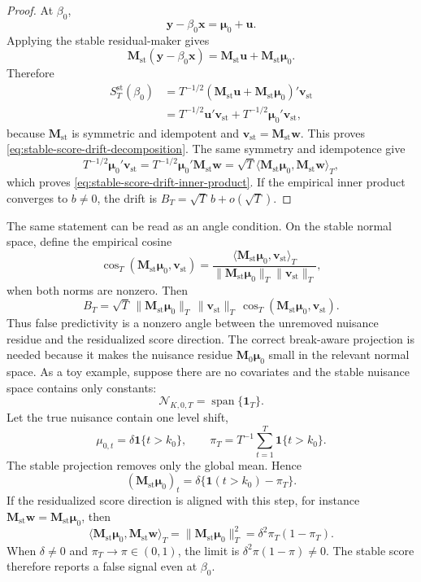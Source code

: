 \documentclass[12pt]{article}
\numberwithin{equation}{section}
\theoremstyle{definition}
\newcommand{\ind}{\mathbf 1}
\newcommand{\N}{\mathcal N}
\newcommand{\innerT}[2]{\langle #1,#2\rangle_T}
\begin{document}
\begin{proof}
At \(\beta_0\),
\[
    \bm y-\beta_0\bm x=\bm\mu_0+\bm u.
\]
Applying the stable residual-maker gives
\[
    \bm M_{\mathrm{st}}(\bm y-\beta_0\bm x)
    =
    \bm M_{\mathrm{st}}\bm u
    +
    \bm M_{\mathrm{st}}\bm\mu_0.
\]
Therefore
\[
\begin{aligned}
    S_T^{\mathrm{st}}(\beta_0)
    &=
    T^{-1/2}
    (\bm M_{\mathrm{st}}\bm u+\bm M_{\mathrm{st}}\bm\mu_0)'
    \bm v_{\mathrm{st}}  \\
    &=
    T^{-1/2}\bm u'\bm v_{\mathrm{st}}
    +
    T^{-1/2}\bm\mu_0'\bm v_{\mathrm{st}},
\end{aligned}
\]
because \(\bm M_{\mathrm{st}}\) is symmetric and idempotent and
\(\bm v_{\mathrm{st}}=\bm M_{\mathrm{st}}\bm w\). This proves
\eqref{eq:stable-score-drift-decomposition}. The same symmetry and idempotence
give
\[
    T^{-1/2}\bm\mu_0'\bm v_{\mathrm{st}}
    =
    T^{-1/2}\bm\mu_0'\bm M_{\mathrm{st}}\bm w
    =
    \sqrt T
    \innerT{\bm M_{\mathrm{st}}\bm\mu_0}
           {\bm M_{\mathrm{st}}\bm w},
\]
which proves \eqref{eq:stable-score-drift-inner-product}. If the empirical
inner product converges to \(b\ne0\), the drift is \(B_T=\sqrt T\,b+o(\sqrt T)\).
\end{proof}

The same statement can be read as an angle condition. On the stable normal
space, define the empirical cosine
\[
    \cos_T(\bm M_{\mathrm{st}}\bm\mu_0,\bm v_{\mathrm{st}})
    =\frac{\innerT{\bm M_{\mathrm{st}}\bm\mu_0}{\bm v_{\mathrm{st}}}}
           {\|\bm M_{\mathrm{st}}\bm\mu_0\|_T\|\bm v_{\mathrm{st}}\|_T},
\]
when both norms are nonzero. Then
\[
    B_T=\sqrt T\,
    \|\bm M_{\mathrm{st}}\bm\mu_0\|_T\,\|\bm v_{\mathrm{st}}\|_T\,
    \cos_T(\bm M_{\mathrm{st}}\bm\mu_0,\bm v_{\mathrm{st}}).
\]
Thus false predictivity is a nonzero angle between the unremoved nuisance
residue and the residualized score direction. The correct break-aware projection
is needed because it makes the nuisance residue \(\bm M_0\bm\mu_0\) small in the
relevant normal space.
As a toy example, suppose there are no covariates and the stable nuisance space
contains only constants:
\[
    \N_{K,0,T}=\operatorname{span}\{\bm 1_T\}.
\]
Let the true nuisance contain one level shift,
\[
    \mu_{0,t}=\delta\ind\{t>k_0\},
    \qquad
    \pi_T=T^{-1}\sum_{t=1}^T\ind\{t>k_0\}.
\]
The stable projection removes only the global mean. Hence
\[
    (\bm M_{\mathrm{st}}\bm\mu_0)_t
    =
    \delta\{\ind(t>k_0)-\pi_T\}.
\]
If the residualized score direction is aligned with this step, for instance
\(\bm M_{\mathrm{st}}\bm w=\bm M_{\mathrm{st}}\bm\mu_0\), then
\[
    \innerT{\bm M_{\mathrm{st}}\bm\mu_0}
           {\bm M_{\mathrm{st}}\bm w}
    =
    \|\bm M_{\mathrm{st}}\bm\mu_0\|_T^2
    =
    \delta^2\pi_T(1-\pi_T).
\]
When \(\delta\ne0\) and \(\pi_T\to\pi\in(0,1)\), the limit is
\(\delta^2\pi(1-\pi)\ne0\). The stable score therefore reports a false signal
even at \(\beta_0\).
\end{document}
